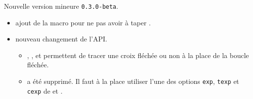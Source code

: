 Nouvelle version mineure \verb+0.3.0-beta+.

\begin{itemize}[itemsep=.5em]
    \item {}
          ajout de la macro  pour ne pas avoir à taper .


    \item {} nouveau changement de l'API.
    \begin{itemize}[itemsep=.5em]
        \item {}, ,  et  permettent de tracer une croix fléchée ou non à la place de la boucle fléchée.

        \item {} a été supprimé. Il faut à la place utiliser l'une des options \verb#exp#, \verb#texp# et \verb#cexp# de  et .
    \end{itemize}


\end{itemize}

\separation

